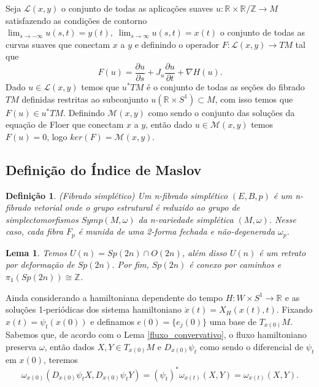 \documentclass[12pt]{book}
\newtheorem{lema}[teorema]{Lema}
\newtheorem{definicao}[teorema]{Definição}
\newcommand{\circulo}{S^{1}}
\newcommand{\derivadaparcial}[2]{\frac{\partial #1}{\partial #2}}
\newcommand{\orbitasconectantes}[2]{\mathcal{M}(#1, #2)}
\newcommand{\retacartesianocirculo}{\real{} \times \circulo}
\newcommand{\real}[1]{\mathbb{R}^{#1}}
\newcommand{\vermelho}[1]{{\color{red}#1}}
\begin{document}
	
	
	Seja $\mathcal{L}(x,y)$ o conjunto de todas as aplicações suaves $u:\real{}\times \real{}/\mathbb{Z} \to M$ satisfazendo as condições de contorno $\lim_{s\to -\infty} u(s,t) = y(t), \; 	\lim_{s\to \infty} u(s,t) = x(t)$ o conjunto de todas as curvas suaves que conectam $x$ a $y$ e definindo o operador $F:\mathcal{L}(x,y) \to TM$ tal que 
	$$
	F(u) = \derivadaparcial{u}{s} + J_{u}\derivadaparcial{u}{t}+ \nabla H(u).
	$$
	Dado $u \in \mathcal{L}(x,y)$ temos que $u^{*}TM$ \vermelho{é o conjunto de todas as seções do fibrado $TM$ definidas restritas ao subconjunto $u(\retacartesianocirculo) \subset M$}, com isso temos que $F(u) \in u^{*}TM$. Definindo $\orbitasconectantes{x}{y}$ como sendo o conjunto das soluções da equação de Floer que conectam $x$ a $y$, então dado $u \in \orbitasconectantes{x}{y}$ temos $F(u) = 0$, logo $ker(F) = \orbitasconectantes{x}{y}$.
	
	
	\subsection{Definição do Índice de Maslov}
	
	\begin{definicao}
		(Fibrado simplético) Um n-fibrado simplético $(E,B, p)$ é um n-fibrado vetorial onde o grupo estrutural é reduzido ao grupo de simplectomorfismos $Symp(M,\omega)$ da n-variedade simplética $(M,\omega)$. Nesse caso, cada fibra $F_{p}$ é munida de uma 2-forma fechada e não-degenerada $\omega_{p}$.
	\end{definicao}
	
	\begin{lema}\label{Sp2n_homotopia}
		Temos $U(n) = Sp(2n)\cap O(2n)$, além disso $U(n)$ é um retrato por deformação de $Sp(2n)$. Por fim, $Sp(2n)$ é conexo por caminhos e $\pi_{1}(Sp(2n)) \cong \mathbb{Z}$.
	\end{lema}
	
	Ainda considerando a hamiltoniana dependente do tempo $H:W \times S^{1} \to \real{}$ e as soluções 1-periódicas dos sistema hamiltoniano $\dot{x}(t) = X_{H}(x(t), t)$. Fixando $x(t) = \psi_{t}(x(0))$ e definamos $e(0) = \{e_{j}(0)\}$ uma base de $T_{x(0)}M$. Sabemos que, de acordo com o Lema \ref{fluxo_convervativo}, o fluxo hamiltoniano preserva $\omega$, então dados $X,Y \in T_{x(0)}M$ e $D_{x(0)}\psi_{t}$ como sendo o diferencial de $\psi_{t}$ em $x(0)$, teremos
	$$
	\omega_{x(0)}(D_{x(0)}\psi_{t}X, D_{x(0)}\psi_{t}Y)=(\psi_{t})^{*}\omega_{x(t)}(X,Y) = \omega_{x(t)}(X,Y).
	$$
	
\end{document}
